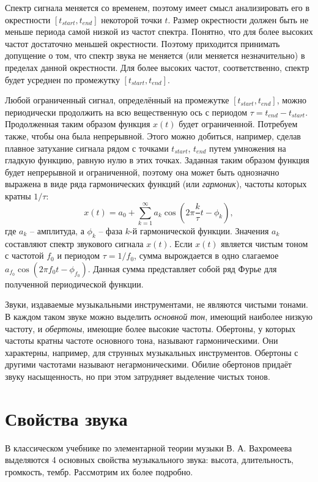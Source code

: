Спектр сигнала меняется со временем, поэтому имеет смысл анализировать его в
окрестности $[t_{start}, t_{end}]$ некоторой точки $t$. Размер окрестности
должен быть не меньше периода самой низкой из частот спектра. Понятно, что для
более высоких частот достаточно меньшей окрестности. Поэтому приходится
принимать допущение о том, что спектр звука не меняется (или меняется
незначительно) в пределах данной окрестности. Для более высоких частот,
соответственно, спектр будет усреднен по промежутку $[t_{start}, t_{end}]$.

Любой ограниченный сигнал, определённый на промежутке $[t_{start}, t_{end}]$,
можно периодически продолжить на всю вещественную ось с периодом $\tau = t_{end}
- t_{start}$. Продолженная таким образом функция $x(t)$ будет ограниченной.
Потребуем также, чтобы она была непрерывной. Этого можно добиться, например,
сделав плавное затухание сигнала рядом с точками $t_{start}$, $t_{end}$ путем
умножения на гладкую функцию, равную нулю в этих точках. Заданная таким
образом функция будет непрерывной и ограниченной, поэтому она может быть
однозначно выражена в виде ряда гармонических функций (или \emph{гармоник}),
частоты которых кратны $1 / \tau$:
$$x(t) = a_0 + \sum_{k=1}^\infty a_k \cos \left(2\pi \frac{k}{\tau} t - \phi_k
\right),$$ где $a_k$ -- амплитуда, а $\phi_k$ -- фаза $k$-й гармонической
функции. Значения $a_k$ составляют спектр звукового сигнала $x(t)$. Если $x(t)$
является чистым тоном с частотой $f_0$ и периодом $\tau = 1/f_0$, сумма
вырождается в одно слагаемое $a_{f_0} \cos(2 \pi f_0 t - \phi_{f_0})$. Данная
сумма представляет собой ряд Фурье для полученной периодической функции.

Звуки, издаваемые музыкальными инструментами, не являются чистыми тонами. В
каждом таком звуке можно выделить \emph{основной тон}, имеющий наиболее низкую
частоту, и \emph{обертоны}, имеющие более высокие частоты. Обертоны, у которых
частоты кратны частоте основного тона, называют гармоническими. Они
характерны, например, для струнных музыкальных инструментов. Обертоны с другими
частотами называют негармоническими. Обилие обертонов придаёт звуку
насыщенность, но при этом затрудняет выделение чистых тонов.

\section{Свойства звука} \label{sectT_prop}

В классическом учебнике по элементарной теории музыки В. А. Вахромеева
\cite{Vahromeev1962} выделяются 4 основных свойства музыкального звука: высота,
длительность, громкость, тембр. Рассмотрим их более подробно.

